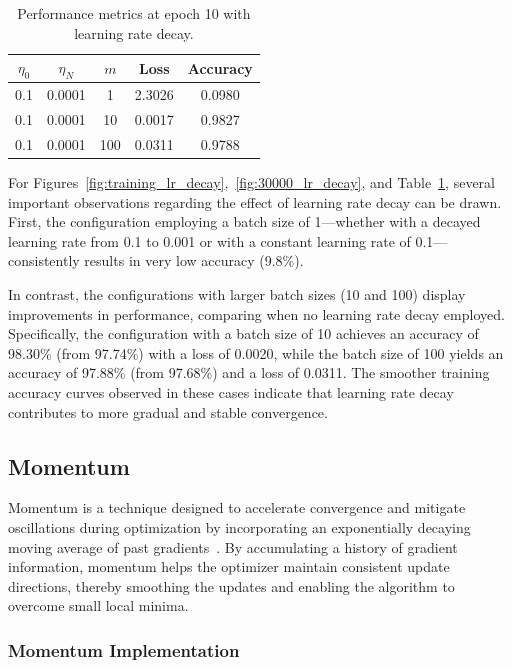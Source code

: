 \begin{table}
    \centering
    \begin{tabular}{|c|c|c|c|c|}
        \hline
        \textbf{\(\eta_0\)} & \textbf{\(\eta_N\)} & \textbf{\(m\)} & \textbf{Loss} & \textbf{Accuracy} \\
        \hline
        0.1   & 0.0001   & 1 & 2.3026  & 0.0980 \\
        0.1   & 0.0001  & 10 & 0.0017  & 0.9827 \\
        0.1   & 0.0001 & 100 & 0.0311  & 0.9788 \\
        \hline
    \end{tabular}
    \caption{Performance metrics at epoch 10 with learning rate decay.}
    \label{tab:learning_rate_decay}
\end{table}

For Figures~\ref{fig:training_lr_decay},~\ref{fig:30000_lr_decay}, and Table~\ref{tab:learning_rate_decay}, several important observations regarding the effect of learning rate decay can be drawn. First, the configuration employing a batch size of 1—whether with a decayed learning rate from 0.1 to 0.001 or with a constant learning rate of 0.1—consistently results in very low accuracy (9.8\%).

In contrast, the configurations with larger batch sizes (10 and 100) display improvements in performance, comparing when no learning rate decay employed. Specifically, the configuration with a batch size of 10 achieves an accuracy of 98.30\% (from 97.74\%) with a loss of 0.0020, while the batch size of 100 yields an accuracy of 97.88\% (from 97.68\%) and a loss of 0.0311. The smoother training accuracy curves observed in these cases indicate that learning rate decay contributes to more gradual and stable convergence.

\subsection{Momentum}

Momentum is a technique designed to accelerate convergence and mitigate oscillations during optimization by incorporating an exponentially decaying moving average of past gradients~\cite{fu2023when}. By accumulating a history of gradient information, momentum helps the optimizer maintain consistent update directions, thereby smoothing the updates and enabling the algorithm to overcome small local minima.

\subsubsection{Momentum Implementation}

